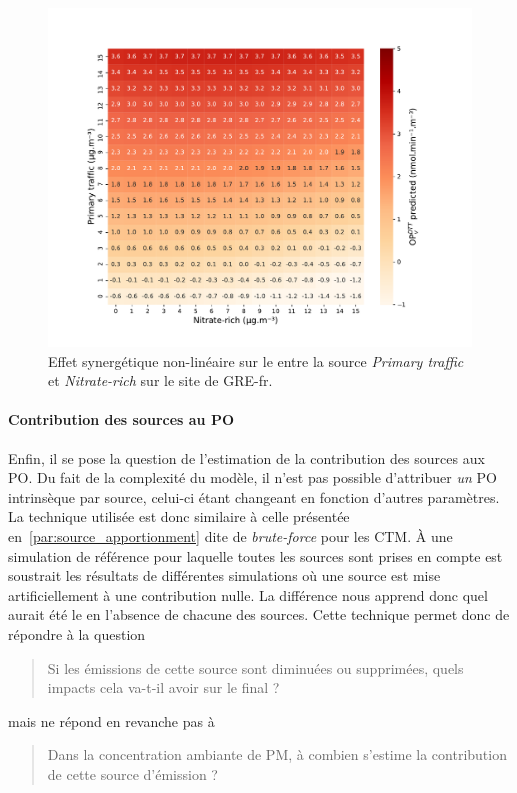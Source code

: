 \begin{figure}[ht]
    \centering
    \includegraphics[width=0.7\linewidth]{figures/chapter05/coktail_Primary traffic_Nitrate-rich.pdf}
    \caption{Effet synergétique non-linéaire sur le \PODTTv{} entre la source \textit{Primary
    traffic} et \textit{Nitrate-rich} sur le site de GRE-fr.}%
    \label{fig:figures/chapter05/coktail_Primary traffic_Nitrate-rich}
\end{figure}

\paragraph{Contribution des sources au PO}%
\label{par:contribution_des_sources_au_po}

Enfin, il se pose la question de l'estimation de la contribution des sources aux PO. Du
fait de la complexité du modèle, il n'est pas possible d'attribuer \emph{un} PO
intrinsèque par source, celui-ci étant changeant en fonction d'autres paramètres.
La technique utilisée est donc similaire à celle présentée
en~\ref{par:source_apportionment} dite de \textit{brute-force} pour les CTM. À une
simulation de référence pour laquelle toutes les sources sont prises en compte est
soustrait les résultats de différentes simulations où une source est mise artificiellement à une
contribution nulle.  La différence nous apprend donc quel aurait été le \POv{} en
l'absence de chacune des sources.
Cette technique permet donc de répondre à la question
\begin{quote}
   Si les émissions de cette source sont diminuées ou supprimées, quels impacts cela va-t-il
   avoir sur le \POv{} final ?
\end{quote}
mais ne répond en revanche pas à
\begin{quote}
   Dans la concentration ambiante de PM, à combien s'estime la contribution de cette source
   d'émission ?
\end{quote}

